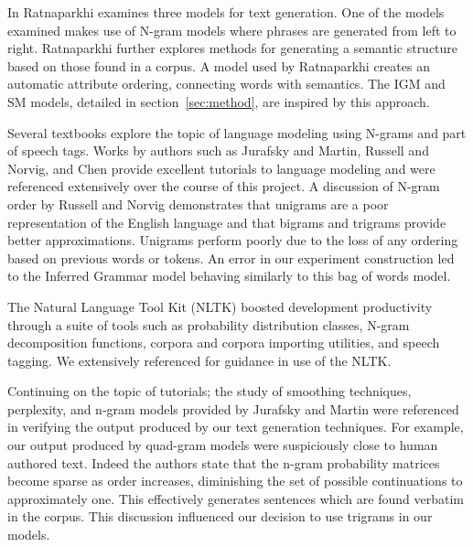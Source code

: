 \documentclass[ai15_group61_report.tex]{subfiles}
\begin{document}

In \cite{Ratnaparkhi00} Ratnaparkhi examines three models for text generation. One of the models examined makes use of N-gram models where phrases are generated from left to right. Ratnaparkhi further explores methods for generating a semantic structure based on those found in a corpus. A model used by Ratnaparkhi creates an automatic attribute ordering, connecting words with semantics. The IGM and SM models, detailed in section~\ref{sec:method}, are inspired by this approach. 

Several textbooks explore the topic of language modeling using N-grams and part of speech tags. Works by authors such as Jurafsky and Martin\cite{Jurafsky2000}, Russell and Norvig\cite{RussellNorvigAIBook3rd}, and Chen\cite{chen-smoothing} provide excellent tutorials to language modeling and were referenced extensively over the course of this project. A discussion of N-gram order by Russell and Norvig demonstrates that unigrams are a poor representation of the English language and that bigrams and trigrams provide better approximations. Unigrams perform poorly due to the loss of any ordering based on previous words or tokens. An error in our experiment construction led to the Inferred Grammar model behaving similarly to this bag of words model.

The Natural Language Tool Kit (NLTK) boosted development productivity through a suite of tools such as probability distribution classes, N-gram decomposition functions, corpora and corpora importing utilities, and speech tagging. We extensively referenced \cite{NLTKBook09} for guidance in use of the NLTK. 

Continuing on the topic of tutorials; the study of smoothing techniques, perplexity, and n-gram models provided by Jurafsky and Martin\cite{Jurafsky2000} were referenced in verifying the output produced by our text generation techniques. For example, our output produced by quad-gram models were suspiciously close to human authored text. Indeed the authors state that the n-gram probability matrices become sparse as order increases, diminishing the set of possible continuations to approximately one. This effectively generates sentences which are found verbatim in the corpus. This discussion influenced our decision to use trigrams in our models. 
\end{document}
